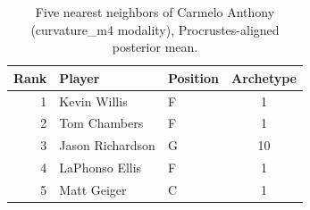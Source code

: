 \begin{table}[htbp]
  \centering\small
  \begin{tabular}{rllc}
    \toprule
    Rank & Player & Position & Archetype \\
    \midrule
    1 & Kevin Willis & F & 1 \\
    2 & Tom Chambers & F & 1 \\
    3 & Jason Richardson & G & 10 \\
    4 & LaPhonso Ellis & F & 1 \\
    5 & Matt Geiger & C & 1 \\
    \bottomrule
  \end{tabular}
  \caption{Five nearest neighbors of Carmelo Anthony (curvature_m4 modality), Procrustes-aligned posterior mean.}
  \label{tab:Carmelo_Anthony_neighbors_curvature_m4}
\end{table}

